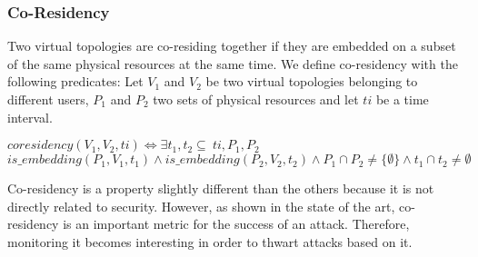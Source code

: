 \subsubsection{Co-Residency}
\label{sec:prop-cores}
Two virtual topologies are co-residing together if they are embedded on a subset of the same physical resources at the same time.
We define co-residency with the following predicates:
Let $V_1$ and $V_2$ be two virtual topologies belonging to different users, $P_1$ and $P_2$ two sets of physical resources and let $ti$ be a time interval.
\begin{myformula}
$coresidency(V_1,V_2,ti) \Leftrightarrow \exists t_1,t_2\subseteq~ti,P_1,P_2$ $is\_embedding(P_1,V_1,t_1) \wedge is\_embedding(P_2,V_2,t_2) \wedge P_1 \cap P_2 \neq \{\emptyset\} \wedge t_1 \cap t_2  \neq \emptyset$
\end{myformula}
Co-residency is a property slightly different than the others because it is not directly related to security.
However, as shown in the state of the art, co-residency is an important metric for the success of an attack.
Therefore, monitoring it becomes interesting in order to thwart attacks based on it.



